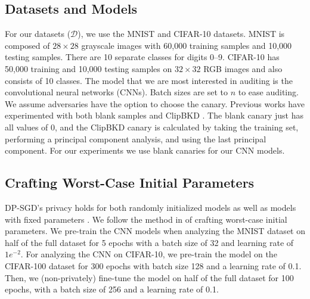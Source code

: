 \documentclass{article}
\theoremstyle{plain}
\theoremstyle{definition}
\theoremstyle{remark}
\begin{document}
\subsection{Datasets and Models}
For our datasets ($\mathcal D$), we use the MNIST \cite{lecun1998mnist} and CIFAR-10 \cite{krizhevsky2009learning} datasets. MNIST is composed of $28 \times 28$ grayscale images with 60,000 training samples and 10,000 testing samples. There are 10 separate classes for digits 0--9. CIFAR-10 has 50,000 training and 10,000 testing samples on $32\times 32$ RGB images and also consists of 10 classes. 
The model that we are most interested in auditing is the convolutional neural networks (CNNs). Batch sizes are set to $n$ to ease auditing. We assume adversaries have the option to choose the canary. Previous works have experimented with both blank samples \cite{nasr2023tight} and ClipBKD \cite{jagielski2020auditing}. The blank canary just has all values of 0, and the ClipBKD canary is calculated by taking the training set, performing a principal component analysis, and using the last principal component. For our experiments we use blank canaries for our CNN models.


\subsection{Crafting Worst-Case Initial Parameters}
DP-SGD's privacy holds for both randomly initialized models as well as models with fixed parameters \cite{nasr2023tight, jagielski2020auditing}. We follow the method in \cite{muthu2024nearly} of crafting worst-case initial parameters. We pre-train the CNN models when analyzing the MNIST dataset on half of the full dataset for 5 epochs with a batch size of 32 and learning rate of $1e^{-2}$. For analyzing the CNN on CIFAR-10, we pre-train the model on the CIFAR-100 dataset for 300 epochs with batch size 128 and a learning rate of 0.1. Then, we (non-privately) fine-tune the model on half of the full dataset for 100 epochs, with a batch size of 256 and a learning rate of 0.1.
\end{document}
